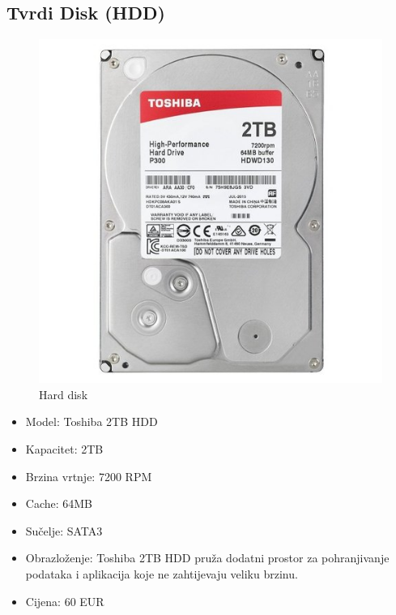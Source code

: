 \documentclass{article}
\begin{document}
\subsection{Tvrdi Disk (HDD)}
\begin{figure}[H]
    \centering
    \includegraphics[scale=0.1]{Slike/HDD.jpg}
    \caption{Hard disk}
    \label{fig:HDD}
\end{figure}
\begin{itemize}
    \item Model: Toshiba 2TB HDD
    \item Kapacitet: 2TB
    \item Brzina vrtnje: 7200 RPM
    \item Cache: 64MB
    \item Sučelje: SATA3
    \item Obrazloženje: Toshiba 2TB HDD pruža dodatni prostor za pohranjivanje podataka i aplikacija koje ne zahtijevaju veliku brzinu.
    \item Cijena: 60 EUR 
\end{itemize}
\end{document}
